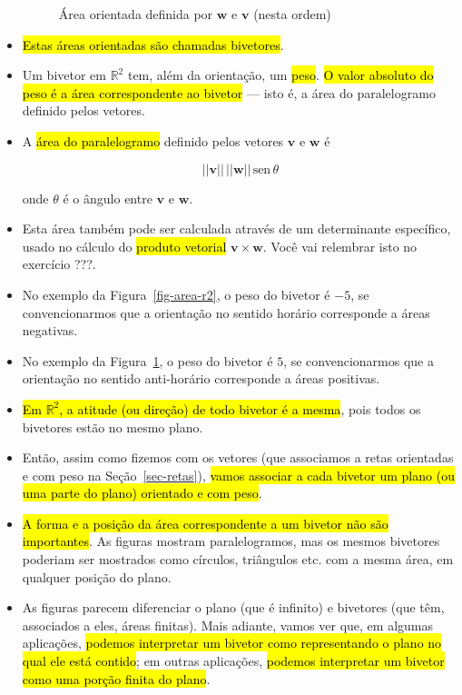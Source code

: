 \documentclass[
  letterpaper,
  DIV=11,
  numbers=noendperiod]{scrreprt}
\begin{document}
\begin{itemize}
\begin{figure}[htb]
{  }

  \caption{\label{fig-area-r2-2}Área orientada definida por $\mathbf{w}$
  e $\mathbf{v}$ (nesta ordem)}

  \end{figure}
\item
  {\hl{Estas áreas orientadas são chamadas bivetores}}.
\item
  Um bivetor em $\mathbb{R}^2$ tem, além da orientação, um {\hl{peso}}.
  {\hl{O valor absoluto do peso é a área correspondente ao bivetor}} ---
  isto é, a área do paralelogramo definido pelos vetores.
\item
  A {\hl{área do paralelogramo}} definido pelos vetores $\mathbf{v}$ e
  $\mathbf{w}$ é

  \[
  ||\mathbf{v}||\, ||\mathbf{w}|| \,\text{sen}\,\theta
  \]

  onde $\theta$ é o ângulo entre $\mathbf{v}$ e $\mathbf{w}$.
\item
  Esta área também pode ser calculada através de um determinante
  específico, usado no cálculo do {\hl{produto vetorial}}
  $\mathbf{v} \times \mathbf{w}$. Você vai relembrar isto no exercício
  ???.
\item
  No exemplo da Figura~\ref{fig-area-r2}, o peso do bivetor é $-5$, se
  convencionarmos que a orientação no sentido horário corresponde a
  áreas negativas.
\item
  No exemplo da Figura~\ref{fig-area-r2-2}, o peso do bivetor é $5$, se
  convencionarmos que a orientação no sentido anti-horário corresponde a
  áreas positivas.
\item
  {\hl{Em $\mathbb{R}^2$, a atitude (ou direção) de todo bivetor é a
  mesma}}, pois todos os bivetores estão no mesmo plano.
\item
  Então, assim como fizemos com os vetores (que associamos a retas
  orientadas e com peso na Seção~\ref{sec-retas}), {\hl{vamos associar a
  cada bivetor um plano (ou uma parte do plano) orientado e com peso}}.
\item
  {\hl{A forma e a posição da área correspondente a um bivetor não são
  importantes}}. As figuras mostram paralelogramos, mas os mesmos
  bivetores poderiam ser mostrados como círculos, triângulos etc. com a
  mesma área, em qualquer posição do plano.
\item
  As figuras parecem diferenciar o plano (que é infinito) e bivetores
  (que têm, associados a eles, áreas finitas). Mais adiante, vamos ver
  que, em algumas aplicações, {\hl{podemos interpretar um bivetor como
  representando o plano no qual ele está contido}}; em outras
  aplicações, {\hl{podemos interpretar um bivetor como uma porção finita
  do plano}}.


\end{itemize}
\end{document}
